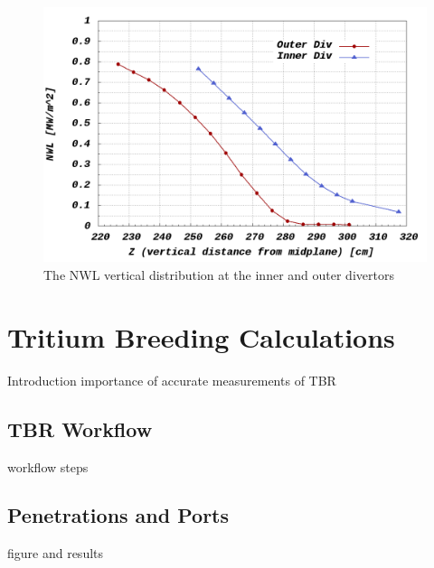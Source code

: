\documentclass[12pt, letterpaper]{elsarticle}
\begin{document}
\begin{figure}[h!]
  \centering
  \includegraphics[scale=0.2]{../plots/NWL_2divs.png}
  \caption{The NWL vertical distribution at the inner and outer divertors}
  \label{fig:NWL 2Divs}
\end{figure}

\section{Tritium Breeding Calculations} \label{Tritium Breeding Calculations}
Introduction
importance of accurate measurements of TBR
\subsection{TBR Workflow} \label{TBR Workflow}
workflow steps
\subsection{Penetrations and Ports} \label{Penetrations and Ports}
figure and results
\end{document}
